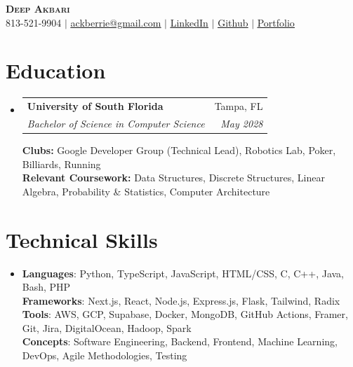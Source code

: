 \documentclass[letterpaper,11pt]{article}
\makeatletter
\newcommand{\resumeSubheading}[4]{
  \vspace{-2pt}\item
    \begin{tabular*}{0.97\textwidth}[t]{l@{\extracolsep{\fill}}r}
      \textbf{#1} & #2 \\
      \textit{\small#3} & \textit{\small #4} \\
    \end{tabular*}\vspace{-7pt}
}
\newcommand{\resumeSubHeadingListStart}{\begin{itemize}[leftmargin=0.15in, label={}]}
\newcommand{\resumeSubHeadingListEnd}{\end{itemize}}
\makeatother
\begin{document}

\begin{center}
    \textbf{\Huge \scshape Deep Akbari} \\ \vspace{1pt}
    \small 813-521-9904 $|$ \href{mailto:ackberrie@gmail.com}{\underline{ackberrie@gmail.com}} $|$ 
    \href{https://www.linkedin.com/in/deep-akbari/}{\underline{LinkedIn}} $|$
    \href{https://github.com/ackberry}{\underline{Github}} $|$
    \href{https://ackberry.club/}{\underline{Portfolio}}
\end{center}


\section{Education}
  \resumeSubHeadingListStart
    \resumeSubheading
      {University of South Florida}{Tampa, FL}
      {Bachelor of Science in Computer Science}{May 2028}

      \vspace{0.7em}
      \textbf{Clubs:} Google Developer Group (Technical Lead), Robotics Lab, Poker, Billiards, Running \\
      \textbf{Relevant Coursework:} Data Structures, Discrete Structures, Linear Algebra, Probability \& Statistics, Computer Architecture
  \resumeSubHeadingListEnd

\section{Technical Skills}
\resumeSubHeadingListStart
  \item \small{
    \textbf{Languages}: Python, TypeScript, JavaScript, HTML/CSS, C, C++, Java, Bash, PHP \\
    \textbf{Frameworks}: Next.js, React, Node.js, Express.js, Flask, Tailwind, Radix \\
    \textbf{Tools}: AWS, GCP, Supabase, Docker, MongoDB, GitHub Actions, Framer, Git, Jira, DigitalOcean, Hadoop, Spark \\
    \textbf{Concepts}: Software Engineering, Backend, Frontend, Machine Learning, DevOps, Agile Methodologies, Testing
  }
\resumeSubHeadingListEnd
\end{document}
